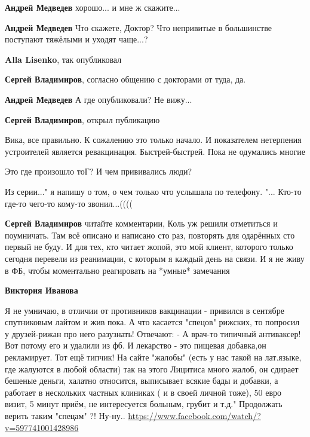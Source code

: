 \begin{itemize}
\begin{itemize}
\textbf{Андрей Медведев} хорошо... и мне ж скажите...

\textbf{Андрей Медведев} Что скажете, Доктор? Что непривитые в большинстве поступают тяжёлыми и уходят чаще...?

\textbf{Alla Lisenko}, так опубликовал

\textbf{Сергей Владимиров}, согласно общению с докторами от туда, да.

\textbf{Андрей Медведев} А где опубликовали? Не вижу...

\textbf{Сергей Владимиров}, открыл публикацию
\end{itemize} %


Вика, все правильно. К сожалению это только начало. И показателем нетерпения
устроителей является ревакцинация. Быстрей-быстрей. Пока не одумались многие


Это где произошло тоГ? И чем прививались люди?

Из серии..." я напишу о том, о чем только что услышала по телефону. "... Кто-то где-то чего-то кому-то звонил...((((

\begin{itemize} %
\textbf{Сергей Владимиров} читайте комментарии, Коль уж решили отметиться и поумничать. Там всё описано и написано сто раз, повторять для одарённых сто первый не буду.
И для тех, кто читает жопой, это мой клиент, которого только сегодня перевели из реанимации, с которым я каждый день на связи.
И я не живу в ФБ, чтобы моментально реагировать на *умные* замечания

\textbf{Виктория Иванова} 

Я не умничаю, в отличии от противников вакцинации - привился в сентябре
спутниковым лайтом и жив пока. А что касается "спецов" рижских, то попросил у
друзей-рижан про него разузнать! Отвечают: - А врач-то типичный антиваксер! Вот
потому его и удалили из фб. И лекарство - это пищевая добавка,он рекламирует.
Тот ещё типчик! На сайте "жалобы" (есть у нас такой на лат.языке, где жалуются
в любой области) так на этого Лицитиса много жалоб, он сдирает бешеные деньги,
халатно относится, выписывает всякие бады и добавки, а работает в нескольких
частных клиниках ( и в своей личной тоже), 50 евро визит, 5 минут приём, не
интересуется больным, грубит и т.д." Продолжать верить таким "спецам" ?!
Ну-ну.. \url{https://www.facebook.com/watch/?v=597741001428986}



\end{itemize}
\end{itemize}
